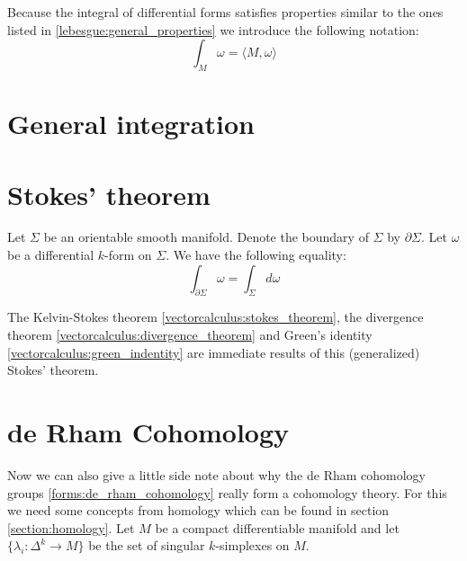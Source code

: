 	\begin{notation}
		Because the integral of differential forms satisfies properties similar to the ones listed in \ref{lebesgue:general_properties} we introduce the following notation:
		\begin{equation}
			\int_M\omega = \langle M, \omega \rangle
		\end{equation}
	\end{notation}
	
\section{General integration}

\section{Stokes' theorem}	

	\begin{theorem}
		Let $\Sigma$ be an orientable smooth manifold. Denote the boundary of $\Sigma$ by $\partial\Sigma$. Let $\omega$ be a differential $k$-form on $\Sigma$. We have the following equality:
		\begin{equation}
			\label{forms:theorem:stokes_theorem}
			\boxed{\int_{\partial\Sigma}\omega = \int_\Sigma d\omega}
		\end{equation}
	\end{theorem}
	\begin{result}
		The Kelvin-Stokes theorem \ref{vectorcalculus:stokes_theorem}, the divergence theorem \ref{vectorcalculus:divergence_theorem} and Green's identity \ref{vectorcalculus:green_indentity} are immediate results of this (generalized) Stokes' theorem.
	\end{result}

\section{de Rham Cohomology}

	Now we can also give a little side note about why the de Rham cohomology groups \ref{forms:de_rham_cohomology} really form a cohomology theory. For this we need some concepts from homology which can be found in section \ref{section:homology}. Let $M$ be a compact differentiable manifold and let $\{\lambda_i:\Delta^k\rightarrow M\}$ be the set of singular $k$-simplexes on $M$.
	
